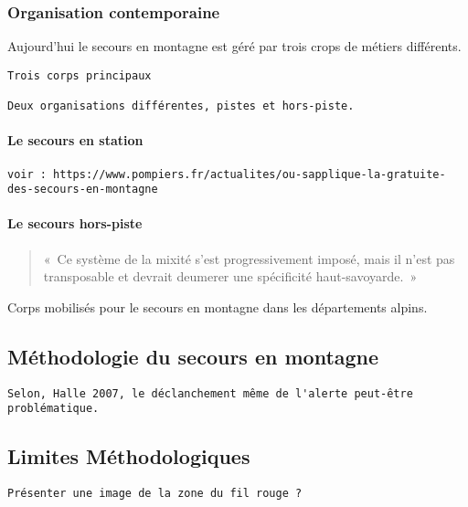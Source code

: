 \subsubsection{Organisation contemporaine}
\label{subsubsec:1-1-1-2}

Aujourd'hui le secours en montagne est géré par trois crops de métiers
différents.

\begin{verbatim}
Trois corps principaux

Deux organisations différentes, pistes et hors-piste.
\end{verbatim}


\paragraph{Le secours en station}

\begin{verbatim}
voir : https://www.pompiers.fr/actualites/ou-sapplique-la-gratuite-des-secours-en-montagne
\end{verbatim}


\paragraph{Le secours hors-piste}



\begin{quotation}
  «~Ce système de la mixité s'est progressivement imposé, mais il
  n'est pas transposable et devrait deumerer une spécificité
  haut-savoyarde.~»
\end{quotation}

\begin{table}
  \centering
  
  \caption{Corps mobilisés pour le secours en montagne dans les
    départements alpins.}
  \label{tab:organisation_secours_departements}
\end{table}

\subsection{Méthodologie du secours en montagne}
\label{susec:1-1-2}

\begin{verbatim}
Selon, Halle 2007, le déclanchement même de l'alerte peut-être
problématique. 
\end{verbatim}

\subsection{Limites Méthodologiques}
\label{subsec:1-1-3}

\texttt{Présenter une image de la zone du fil rouge ?}
